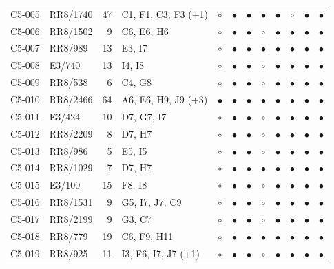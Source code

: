 {\begin{longtable}{llrp{3.9cm}cccccccc}
    C5-005 & RR8/1740 & 47 & C1, F1, C3, F3 (+1) & $\circ$ & $\bullet$ & $\bullet$ & $\bullet$ & $\bullet$ & $\circ$ & $\bullet$ & $\bullet$ \\
    C5-006 & RR8/1502 & 9 & C6, E6, H6 & $\circ$ & $\bullet$ & $\bullet$ & $\circ$ & $\bullet$ & $\bullet$ & $\bullet$ & $\bullet$ \\
    C5-007 & RR8/989 & 13 & E3, I7 & $\circ$ & $\bullet$ & $\bullet$ & $\bullet$ & $\bullet$ & $\bullet$ & $\bullet$ & $\bullet$ \\
    C5-008 & E3/740 & 13 & I4, I8 & $\circ$ & $\bullet$ & $\bullet$ & $\circ$ & $\bullet$ & $\bullet$ & $\bullet$ & $\bullet$ \\
    C5-009 & RR8/538 & 6 & C4, G8 & $\circ$ & $\bullet$ & $\bullet$ & $\circ$ & $\bullet$ & $\bullet$ & $\bullet$ & $\bullet$ \\
    C5-010 & RR8/2466 & 64 & A6, E6, H9, J9 (+3) & $\bullet$ & $\bullet$ & $\bullet$ & $\bullet$ & $\bullet$ & $\bullet$ & $\bullet$ & $\bullet$ \\
    C5-011 & E3/424 & 10 & D7, G7, I7 & $\circ$ & $\bullet$ & $\bullet$ & $\circ$ & $\bullet$ & $\bullet$ & $\bullet$ & $\bullet$ \\
    C5-012 & RR8/2209 & 8 & D7, H7 & $\circ$ & $\bullet$ & $\bullet$ & $\circ$ & $\bullet$ & $\bullet$ & $\bullet$ & $\bullet$ \\
    C5-013 & RR8/986 & 5 & E5, I5 & $\circ$ & $\bullet$ & $\bullet$ & $\circ$ & $\bullet$ & $\bullet$ & $\bullet$ & $\bullet$ \\
    C5-014 & RR8/1029 & 7 & D7, H7 & $\circ$ & $\bullet$ & $\bullet$ & $\bullet$ & $\bullet$ & $\bullet$ & $\bullet$ & $\bullet$ \\
    C5-015 & E3/100 & 15 & F8, I8 & $\circ$ & $\bullet$ & $\bullet$ & $\circ$ & $\bullet$ & $\bullet$ & $\bullet$ & $\bullet$ \\
    C5-016 & RR8/1531 & 9 & G5, I7, J7, C9 & $\circ$ & $\bullet$ & $\bullet$ & $\circ$ & $\bullet$ & $\bullet$ & $\bullet$ & $\bullet$ \\
    C5-017 & RR8/2199 & 9 & G3, C7 & $\circ$ & $\bullet$ & $\bullet$ & $\circ$ & $\bullet$ & $\bullet$ & $\bullet$ & $\bullet$ \\
    C5-018 & RR8/779 & 19 & C6, F9, H11 & $\circ$ & $\bullet$ & $\bullet$ & $\bullet$ & $\bullet$ & $\bullet$ & $\bullet$ & $\bullet$ \\
    C5-019 & RR8/925 & 11 & I3, F6, I7, J7 (+1) & $\circ$ & $\bullet$ & $\bullet$ & $\circ$ & $\bullet$ & $\bullet$ & $\bullet$ & $\bullet$ \\

\end{longtable}}

